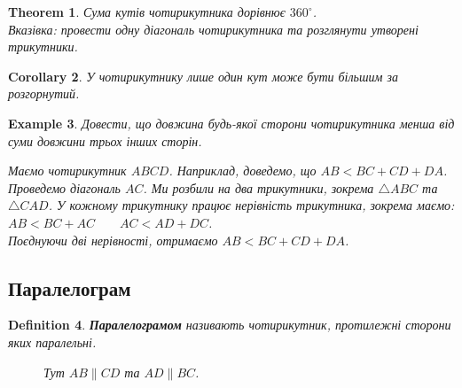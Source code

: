\documentclass[a4paper, 10pt]{article}
\theoremstyle{theoremdd}
\newtheorem{theorem}{Theorem}[subsection]
\theoremstyle{theoremdd}
\theoremstyle{theoremdd}
\newtheorem{definition}[theorem]{Definition}
\theoremstyle{theoremdd}
\theoremstyle{theoremdd}
\newtheorem{example}[theorem]{Example}
\theoremstyle{theoremdd}
\theoremstyle{theoremdd}
\theoremstyle{theoremdd}
\theoremstyle{theoremdd}
\newtheorem{corollary}[theorem]{Corollary}
\begin{document}
\begin{theorem}
Сума кутів чотирикутника дорівнює $360^\circ$.\\
\textit{Вказівка: провести одну діагональ чотирикутника та розглянути утворені трикутники.}
\end{theorem}

\begin{corollary}
У чотирикутнику лише один кут може бути більшим за розгорнутий.
\end{corollary}

\begin{example}
\label{inequality_in_quadrilateral}
Довести, що довжина будь-якої сторони чотирикутника менша від суми довжини трьох інших сторін.\\
\begin{figure}[H]
\centering
{}
\end{figure}
Маємо чотирикутник $ABCD$. Наприклад, доведемо, що $AB < BC + CD + DA$.\\
Проведемо діагональ $AC$. Ми розбили на два трикутники, зокрема $\triangle ABC$ та $\triangle CAD$. У кожному трикутнику працює нерівність трикутника, зокрема маємо:\\
$AB < BC + AC \qquad AC < AD + DC$.\\
Поєднуючи дві нерівності, отримаємо $AB < BC + CD + DA$.
\end{example}

\subsection{Паралелограм}
\begin{definition}
\textbf{Паралелограмом} називають чотирикутник, протилежні сторони яких паралельні.
\begin{figure}[H]
\centering
{}
\caption*{Тут $AB \parallel CD$ та $AD \parallel BC$.}
\end{figure}
\end{definition}
\end{document}
